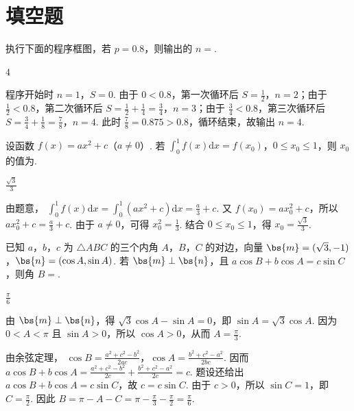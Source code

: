 \section{填空题}

\begin{problem}
执行下面的程序框图，若 \(p = 0.8\)，则输出的 \(n =\)\fillinblank{}.

\end{problem}

\begin{answer}
\(4\)
\end{answer}

\begin{solution}
程序开始时 \(n=1\)，\(S=0\). 由于 \(0<0.8\)，第一次循环后 \(S=\frac12\)，\(n=2\)；由于 \(\frac12<0.8\)，第二次循环后 \(S=\frac12+\frac14=\frac34\)，\(n=3\)；由于 \(\frac34<0.8\)，第三次循环后 \(S=\frac34+\frac18=\frac78\)，\(n=4\). 此时 \(\frac78=0.875>0.8\)，循环结束，故输出 \(n=4\).
\end{solution}

\begin{problem}
设函数 \(f(x) = ax^2 + c\)（\(a \neq 0\)）. 若 \(\int_0^1 f(x)\mathrm{d}x = f(x_0)\)，\(0 \leqslant x_0 \leqslant 1\)，则 \(x_0\) 的值为\fillinblank{}.
\end{problem}

\begin{answer}
\(\frac{\sqrt{3}}{3}\)
\end{answer}

\begin{solution}
由题意，
\(\int_0^1f(x)\mathrm{d}x=\int_0^1(ax^2+c)\mathrm{d}x=\frac{a}{3}+c\). 又 \(f(x_0)=ax_0^2+c\)，所以
\(ax_0^2+c=\frac{a}{3}+c\). 由于 \(a\neq0\)，可得 \(x_0^2=\frac13\). 结合 \(0\leqslant x_0\leqslant1\)，得 \(x_0=\frac{\sqrt3}{3}\).
\end{solution}

\begin{problem}
已知 \(a\)，\(b\)，\(c\) 为 \(\triangle ABC\) 的三个内角 \(A\)，\(B\)，\(C\) 的对边，向量 \(\bs{m} = (\sqrt{3}, -1)\)，\(\bs{n} = (\cos A, \sin A)\). 若 \(\bs{m} \perp \bs{n}\)，且 \(a \cos B + b \cos A = c \sin C\)，则角 \(B =\)\fillinblank{}.
\end{problem}

\begin{answer}
\(\frac{\pi}{6}\)
\end{answer}

\begin{solution}
由 \(\bs{m}\perp\bs{n}\)，得
\(\sqrt3\cos A-\sin A=0\)，即 \(\sin A=\sqrt3\cos A\). 因为 \(0<A<\pi\) 且 \(\sin A>0\)，所以 \(\cos A>0\)，从而 \(A=\frac\pi3\).

由余弦定理，
\(\cos B=\frac{a^2+c^2-b^2}{2ac}\)，\(\cos A=\frac{b^2+c^2-a^2}{2bc}\). 因而
\(a\cos B+b\cos A=\frac{a^2+c^2-b^2}{2c}+\frac{b^2+c^2-a^2}{2c}=c\). 题设还给出 \(a\cos B+b\cos A=c\sin C\)，故 \(c=c\sin C\). 由于 \(c>0\)，所以 \(\sin C=1\)，即 \(C=\frac\pi2\). 因此
\(B=\pi-A-C=\pi-\frac\pi3-\frac\pi2=\frac\pi6\).
\end{solution}

